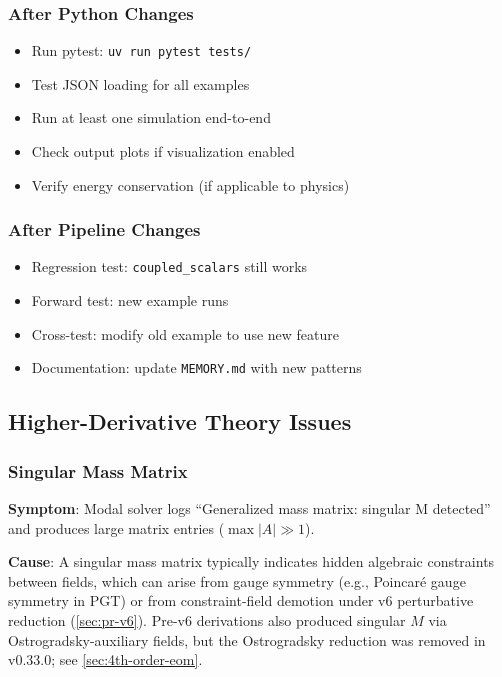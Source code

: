 \subsubsection{After Python Changes}

\begin{itemize}
  \item Run pytest: \texttt{uv run pytest tests/}
  \item Test JSON loading for all examples
  \item Run at least one simulation end-to-end
  \item Check output plots if visualization enabled
  \item Verify energy conservation (if applicable to physics)
\end{itemize}

\subsubsection{After Pipeline Changes}

\begin{itemize}
  \item Regression test: \texttt{coupled\_scalars} still works
  \item Forward test: new example runs
  \item Cross-test: modify old example to use new feature
  \item Documentation: update \texttt{MEMORY.md} with new patterns
\end{itemize}


\subsection{Higher-Derivative Theory Issues}
\label{sec:troubleshoot-higher-derivative}

\subsubsection{Singular Mass Matrix}
\label{sec:troubleshoot-singular-mass}

\textbf{Symptom}: Modal solver logs ``Generalized mass matrix: singular M detected'' and produces large matrix entries ($\max|A| \gg 1$).

\textbf{Cause}: A singular mass matrix typically indicates hidden algebraic constraints between fields, which can arise from gauge symmetry (e.g., Poincar\'e gauge symmetry in PGT) or from constraint-field demotion under v6 perturbative reduction (\cref{sec:pr-v6}). Pre-v6 derivations also produced singular $M$ via Ostrogradsky-auxiliary fields, but the Ostrogradsky reduction was removed in v0.33.0; see \cref{sec:4th-order-eom}.

